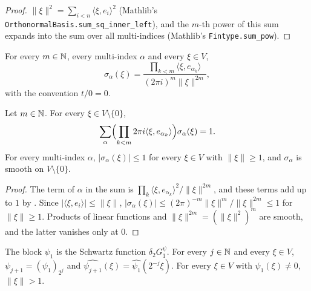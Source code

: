 \begin{proof}
\leanok
$\|\xi\|^2 = \sum_{i < n} \langle \xi, e_i \rangle^2$ (Mathlib's
\texttt{OrthonormalBasis.\allowbreak sum\_\allowbreak sq\_\allowbreak inner\_\allowbreak left}),
and the $m$-th power of this sum expands into the sum over all multi-indices (Mathlib's
\texttt{Fintype.\allowbreak sum\_\allowbreak pow}).
\end{proof}

\begin{definition}
\label{def:derivative-symbol}
\leanok
{}
For every $m \in \mathbb{N}$, every multi-index $\alpha$ and every $\xi \in V$,
\[
  \sigma_\alpha(\xi) = \frac{\prod_{k < m} \langle \xi, e_{\alpha_k} \rangle}
    {(2\pi i)^m \|\xi\|^{2m}} ,
\]
with the convention $t / 0 = 0$.
\end{definition}

\begin{lemma}
\label{lem:derivative-symbol}
\leanok
{}
Let $m \in \mathbb{N}$. For every $\xi \in V \setminus \{0\}$,
\[
  \sum_\alpha \Bigl( \prod_{k < m} 2\pi i \langle \xi, e_{\alpha_k} \rangle \Bigr)
  \sigma_\alpha(\xi) = 1 .
\]
For every multi-index $\alpha$, $|\sigma_\alpha(\xi)| \leq 1$ for every $\xi \in V$ with
$\|\xi\| \geq 1$, and $\sigma_\alpha$ is smooth on $V \setminus \{0\}$.
\end{lemma}

\begin{proof}
\leanok
The term of $\alpha$ in the sum is $\prod_k \langle \xi, e_{\alpha_k} \rangle^2 / \|\xi\|^{2m}$, and
these terms add up to $1$ by . Since
$|\langle \xi, e_i \rangle| \leq \|\xi\|$,
$|\sigma_\alpha(\xi)| \leq (2\pi)^{-m} \|\xi\|^m / \|\xi\|^{2m} \leq 1$ for $\|\xi\| \geq 1$.
Products of linear functions and $\|\xi\|^{2m} = (\|\xi\|^2)^m$ are smooth, and the latter
vanishes only at $0$.
\end{proof}

\begin{lemma}
\label{lem:psi-one}
\leanok
{}
The block $\psi_1$ is the Schwartz function $\delta_2 G^{\psi}_1$. For every $j \in \mathbb{N}$ and every
$\xi \in V$, $\psi_{j+1} = (\psi_1)_{2^j}$ and
$\widehat{\psi_{j+1}}(\xi) = \widehat{\psi_1}(2^{-j} \xi)$. For every $\xi \in V$ with
$\widehat{\psi_1}(\xi) \neq 0$, $\|\xi\| > 1$.
\end{lemma}

